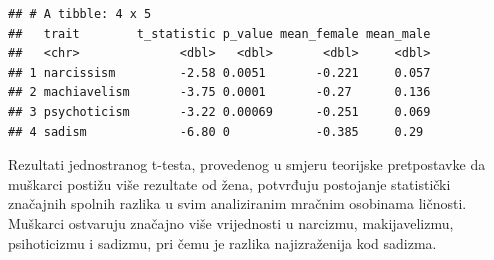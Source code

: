 \documentclass[
]{article}
\newenvironment{Shaded}{\begin{snugshade}}{\end{snugshade}}
\newcommand{\AttributeTok}[1]{\textcolor[rgb]{0.13,0.29,0.53}{#1}}
\newcommand{\ControlFlowTok}[1]{\textcolor[rgb]{0.13,0.29,0.53}{\textbf{#1}}}
\newcommand{\DecValTok}[1]{\textcolor[rgb]{0.00,0.00,0.81}{#1}}
\newcommand{\FunctionTok}[1]{\textcolor[rgb]{0.13,0.29,0.53}{\textbf{#1}}}
\newcommand{\NormalTok}[1]{#1}
\newcommand{\OtherTok}[1]{\textcolor[rgb]{0.56,0.35,0.01}{#1}}
\newcommand{\SpecialCharTok}[1]{\textcolor[rgb]{0.81,0.36,0.00}{\textbf{#1}}}
\newcommand{\StringTok}[1]{\textcolor[rgb]{0.31,0.60,0.02}{#1}}
\begin{document}
\begin{Shaded}
\end{Shaded}

\begin{verbatim}
## # A tibble: 4 x 5
##   trait        t_statistic p_value mean_female mean_male
##   <chr>              <dbl>   <dbl>       <dbl>     <dbl>
## 1 narcissism         -2.58 0.0051       -0.221     0.057
## 2 machiavelism       -3.75 0.0001       -0.27      0.136
## 3 psychoticism       -3.22 0.00069      -0.251     0.069
## 4 sadism             -6.80 0            -0.385     0.29
\end{verbatim}

Rezultati jednostranog t-testa, provedenog u smjeru teorijske
pretpostavke da muškarci postižu više rezultate od žena, potvrđuju
postojanje statistički značajnih spolnih razlika u svim analiziranim
mračnim osobinama ličnosti. Muškarci ostvaruju značajno više vrijednosti
u narcizmu, makijavelizmu, psihoticizmu i sadizmu, pri čemu je razlika
najizraženija kod sadizma.
\end{document}
